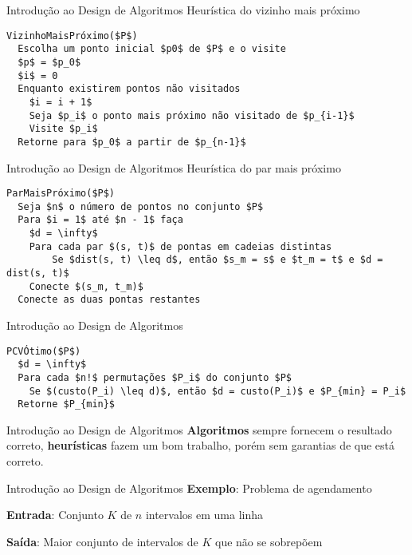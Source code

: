 \documentclass[10pt]{beamer}
\begin{document}
\begin{frame}[fragile]{Introdução ao Design de Algoritmos}
    \Large Heurística do vizinho mais próximo
    \normalsize
    \begin{lstlisting}
VizinhoMaisPróximo($P$)
  Escolha um ponto inicial $p0$ de $P$ e o visite
  $p$ = $p_0$
  $i$ = 0
  Enquanto existirem pontos não visitados
    $i = i + 1$
    Seja $p_i$ o ponto mais próximo não visitado de $p_{i-1}$
    Visite $p_i$
  Retorne para $p_0$ a partir de $p_{n-1}$
    \end{lstlisting}
\end{frame}

\begin{frame}[fragile]{Introdução ao Design de Algoritmos}
    \Large Heurística do par mais próximo
    \normalsize
    \begin{lstlisting}
ParMaisPróximo($P$)
  Seja $n$ o número de pontos no conjunto $P$
  Para $i = 1$ até $n - 1$ faça
    $d = \infty$
    Para cada par $(s, t)$ de pontas em cadeias distintas
        Se $dist(s, t) \leq d$, então $s_m = s$ e $t_m = t$ e $d = dist(s, t)$
    Conecte $(s_m, t_m)$
  Conecte as duas pontas restantes
    \end{lstlisting}
\end{frame}

\begin{frame}[fragile]{Introdução ao Design de Algoritmos}
    \begin{lstlisting}
PCVÓtimo($P$)
  $d = \infty$
  Para cada $n!$ permutações $P_i$ do conjunto $P$
    Se $(custo(P_i) \leq d)$, então $d = custo(P_i)$ e $P_{min} = P_i$
  Retorne $P_{min}$
    \end{lstlisting}


    \bigskip


    \bigskip

\end{frame}

\begin{frame}{Introdução ao Design de Algoritmos}
    \huge
    \textbf{Algoritmos} \alert{sempre} fornecem o resultado correto, \textbf{heurísticas} fazem um bom trabalho, porém sem garantias de que está correto.
\end{frame}

\begin{frame}{Introdução ao Design de Algoritmos}
    \huge
    \textbf{Exemplo}: Problema de agendamento

    \Large
    \textbf{Entrada}: Conjunto $K$ de $n$ intervalos em uma linha

    \textbf{Saída}: Maior conjunto de intervalos de $K$ que não se sobrepõem
\end{frame}
\end{document}
